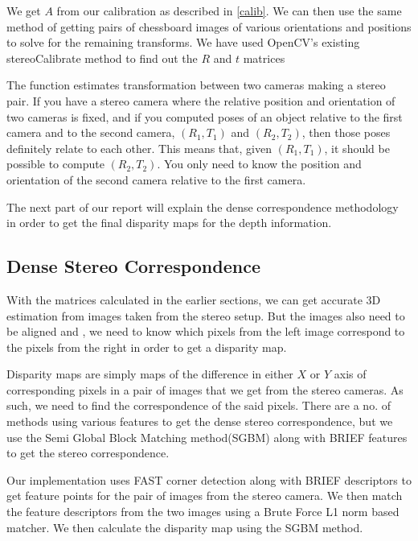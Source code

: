 \documentclass[11pt]{report}
\begin{document}
We get $A$ from our calibration as described in \ref{calib}. We can then use the same method of getting pairs of chessboard images of various orientations and positions to solve for the remaining transforms. We have used OpenCV's existing stereoCalibrate method to find out the $R$ and $t$ matrices\cite{opencvdoc} 

The function estimates transformation between two cameras making a stereo pair. If you have a stereo camera where the relative position and orientation of two cameras is fixed, and if you computed poses of an object relative to the first camera and to the second camera, $(R_1, T_1)$ and $(R_2, T_2)$, then those poses definitely relate to each other. This means that, given $( R_1,T_1 )$, it should be possible to compute $( R_2,T_2 )$. You only need to know the position and orientation of the second camera relative to the first camera.

The next part of our report will explain the dense correspondence methodology in order to get the final disparity maps for the depth information.

\newpage
\label{steroc}
\subsection{Dense Stereo Correspondence}

With the matrices calculated in the earlier sections, we can get accurate 3D estimation from images taken from the stereo setup. But the images also need to be aligned and , we need to know which pixels from the left image correspond to the pixels from the right in order to get a disparity map. 

Disparity maps are simply maps of the difference in either $X$ or $Y$ axis of corresponding pixels in a pair of images that we get from the stereo cameras. As such, we need to find the correspondence of the said pixels. There are a no. of methods using various features to get the dense stereo correspondence, but we use the Semi Global Block Matching method(SGBM)\cite{hirschmuller2008stereo} along with BRIEF features\cite{brief} to get the stereo correspondence.

Our implementation uses FAST corner detection\cite{rosten_2006_machine} along with BRIEF descriptors to get feature points for the pair of images from the stereo camera. We then match the feature descriptors from the two images using a Brute Force L1 norm based matcher. We then calculate the disparity map using the SGBM method. 
\end{document}
